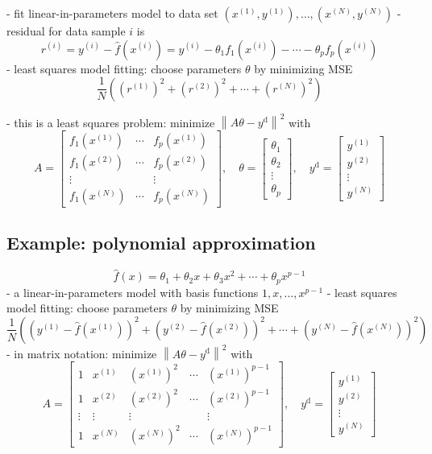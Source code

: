 - fit linear-in-parameters model to data set $ \left(x^{(1)}, y^{(1)}\right), \ldots,\left(x^{(N)}, y^{(N)}\right) $
- residual for data sample $ i $ is
$$
r^{(i)}=y^{(i)}-\hat{f}\left(x^{(i)}\right)=y^{(i)}-\theta_{1} f_{1}\left(x^{(i)}\right)-\cdots-\theta_{p} f_{p}\left(x^{(i)}\right)
$$
- least squares model fitting: choose parameters $ \theta $ by minimizing MSE
$$
\frac{1}{N}\left(\left(r^{(1)}\right)^{2}+\left(r^{(2)}\right)^{2}+\cdots+\left(r^{(N)}\right)^{2}\right)
$$

- this is a least squares problem: minimize $ \left\|A \theta-y^{\mathrm{d}}\right\|^{2} $ with
$$
A=\left[\begin{array}{ccc}
f_{1}\left(x^{(1)}\right) & \cdots & f_{p}\left(x^{(1)}\right) \\
f_{1}\left(x^{(2)}\right) & \cdots & f_{p}\left(x^{(2)}\right) \\
\vdots & & \vdots \\
f_{1}\left(x^{(N)}\right) & \cdots & f_{p}\left(x^{(N)}\right)
\end{array}\right], \quad \theta=\left[\begin{array}{c}
\theta_{1} \\
\theta_{2} \\
\vdots \\
\theta_{p}
\end{array}\right], \quad y^{\mathrm{d}}=\left[\begin{array}{c}
y^{(1)} \\
y^{(2)} \\
\vdots \\
y^{(N)}
\end{array}\right]
$$

\subsection{Example: polynomial approximation}

$$
\hat{f}(x)=\theta_{1}+\theta_{2} x+\theta_{3} x^{2}+\cdots+\theta_{p} x^{p-1}
$$
- a linear-in-parameters model with basis functions $ 1, x, \ldots, x^{p-1} $
- least squares model fitting: choose parameters $ \theta $ by minimizing MSE
$$
\frac{1}{N}\left(\left(y^{(1)}-\hat{f}\left(x^{(1)}\right)\right)^{2}+\left(y^{(2)}-\hat{f}\left(x^{(2)}\right)\right)^{2}+\cdots+\left(y^{(N)}-\hat{f}\left(x^{(N)}\right)\right)^{2}\right)
$$
- in matrix notation: minimize $ \left\|A \theta-y^{\mathrm{d}}\right\|^{2} $ with
$$
A=\left[\begin{array}{ccccc}
1 & x^{(1)} & \left(x^{(1)}\right)^{2} & \cdots & \left(x^{(1)}\right)^{p-1} \\
1 & x^{(2)} & \left(x^{(2)}\right)^{2} & \cdots & \left(x^{(2)}\right)^{p-1} \\
\vdots & \vdots & \vdots & & \vdots \\
1 & x^{(N)} & \left(x^{(N)}\right)^{2} & \cdots & \left(x^{(N)}\right)^{p-1}
\end{array}\right], \quad y^{\mathrm{d}}=\left[\begin{array}{c}
y^{(1)} \\
y^{(2)} \\
\vdots \\
y^{(N)}
\end{array}\right]
$$

